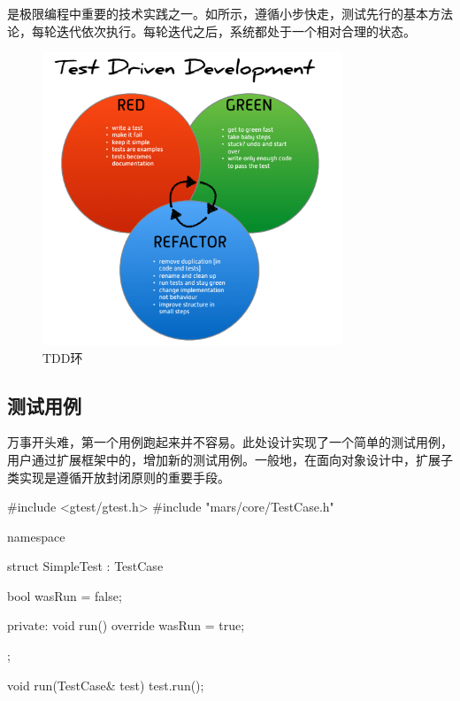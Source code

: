 \begin{content}

是极限编程中重要的技术实践之一。如所示，遵循小步快走，测试先行的基本方法论，每轮迭代依次执行。每轮迭代之后，系统都处于一个相对合理的状态。

\begin{figure}[H]
\centering
\includegraphics[width=0.8\textwidth]{figures/xunit/tdd_cycle.png}
\caption{TDD环}
 \label{fig:tdd-cycle}
\end{figure}

\subsection{测试用例}

万事开头难，第一个用例跑起来并不容易。此处设计实现了一个简单的测试用例，用户通过扩展框架中的，增加新的测试用例。一般地，在面向对象设计中，扩展子类实现是遵循开放封闭原则的重要手段。

\begin{leftbar}
 \begin{c++}[caption={\ttfamily{test/mars/core/TestCaseSpec.cc}}]
#include <gtest/gtest.h>
#include "mars/core/TestCase.h"

namespace {
  struct SimpleTest : TestCase {
    bool wasRun = false;

  private:
    void run() override {
      wasRun = true;
    }
  };

  void run(TestCase& test) {
    test.run();
  }
}


\end{c++}
\end{leftbar}
\end{content}
